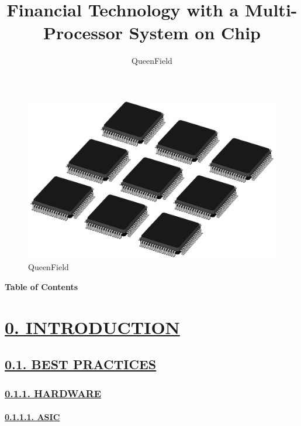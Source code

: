 \documentclass[
]{article}
\title{Financial Technology with a Multi-Processor System on Chip}
\author{QueenField}
\date{}
\begin{document}
\maketitle

\begin{figure}
\centering
\includegraphics{../icon.jpg}
\caption{QueenField}
\end{figure}

\textbf{Table of Contents}

\hypertarget{introduction}{%
\section{\texorpdfstring{\protect\hyperlink{introduction-1}{0.
INTRODUCTION}}{0. INTRODUCTION}}\label{introduction}}

\hypertarget{best-practices}{%
\subsection{\texorpdfstring{\protect\hyperlink{best-practices-1}{0.1.
BEST PRACTICES}}{0.1. BEST PRACTICES}}\label{best-practices}}

\hypertarget{hardware}{%
\subsubsection{\texorpdfstring{\protect\hyperlink{hardware-1}{0.1.1.
HARDWARE}}{0.1.1. HARDWARE}}\label{hardware}}

\hypertarget{asic}{%
\paragraph{\texorpdfstring{\protect\hyperlink{asic-1}{0.1.1.1.
ASIC}}{0.1.1.1. ASIC}}\label{asic}}
\end{document}
